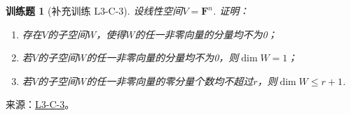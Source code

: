 \documentclass[UTF8,12pt,a4paper,fontset=fandol]{ctexart}
\newtheorem{exercise}{训练题}[section]
\begin{document}
\begin{exercise}[补充训练 L3-C-3]\label{prob:L3-C-3}
设线性空间$V=\mathbf{F}^n$. 证明：
        \begin{enumerate}
            \item 存在$V$的子空间$W$，使得$W$的任一非零向量的分量均不为0；

            \item 若$V$的子空间$W$的任一非零向量的分量均不为0，则$\dim W=1$；

            \item 若$V$的子空间$W$的任一非零向量的零分量个数均不超过$r$，则$\dim W \leqslant r+1$.
        \end{enumerate}
\end{exercise}
\noindent 来源：\href{https://github.com/yhwu-is/Linear-Algebra-Left-Undone/blob/new/%E8%AE%B2%E4%B9%89/%E4%B8%93%E9%A2%98/3%20%E6%9C%89%E9%99%90%E7%BB%B4%E7%BA%BF%E6%80%A7%E7%A9%BA%E9%97%B4.tex}{L3-C-3}。
\end{document}
